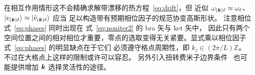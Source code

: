 在相互作用情形这不会精确求解带漂移的热方程~\eqref{eq:drift}，但
近似 $\omega_{(\boldsymbol{k})\ell}\approx\omega_{\ell}$、
$|v_{(\boldsymbol{k})\ell}\rangle\approx|\tilde{v}_{(\boldsymbol{k})\ell}\rangle$ 应当
足以构造带有预期相位因子的规范协变高斯形状。
注意相位式~\eqref{eq:phases} 同时出现在
式~\eqref{eq:noniter2} 的 bra 矢与 ket 矢中，
因此只有两个空间位置之间的相对相位才重要，零点的选取变得无关紧要。显式乘以相位因子式~\eqref{eq:phases} 的明显缺点在于它们
必须遵守格点周期性，即 $k_j\in (2\pi/L)\mathbb{Z}$。
不过在大格点上这样的限制或许可以容忍。
另外引入扭转费米子边界条件~\cite{Bedaque:2004kc,Sachrajda:2004mi}
也可能提供增加 $\boldsymbol{k}$ 选择灵活性的途径。
